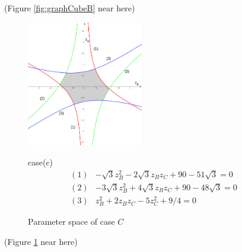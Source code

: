 \documentclass[suppldata, dvipdfmx]{interact}
\theoremstyle{plain}%
\theoremstyle{definition}
\theoremstyle{remark}
\theoremstyle{problemstyle}
\begin{document}
\noindent(Figure \ref{fig:graphCubeB} near here)

\begin{figure}[h!tbp]
 \begin{minipage}[]{0.5\textwidth}
 \centering
 \includegraphics[width=2in,
 keepaspectratio]{./img/graph/cubeC.jpg}
 \caption{Parameter space of case $C$}
 \label{fig:graphCubeC}
 \end{minipage}
 \hspace*{\fill}
 \begin{minipage}[]{0.5\textwidth}
  \centering
  case(c)
  \begin{align*}
   (1)& -\sqrt{3}z_B^2 - 2\sqrt{3}z_Bz_C + 90 - 51\sqrt{3} = 0\\
   (2)& -3\sqrt{3}z_B^2 + 4\sqrt{3}z_B z_C + 90 - 48\sqrt{3} = 0\\
   (3)& z_B^2 + 2 z_B z_C - 5z_C^2 + 9/4 = 0
  \end{align*}
 \end{minipage}
 \hspace*{\fill}
\end{figure}

\noindent(Figure \ref{fig:graphCubeC} near here)
\end{document}
